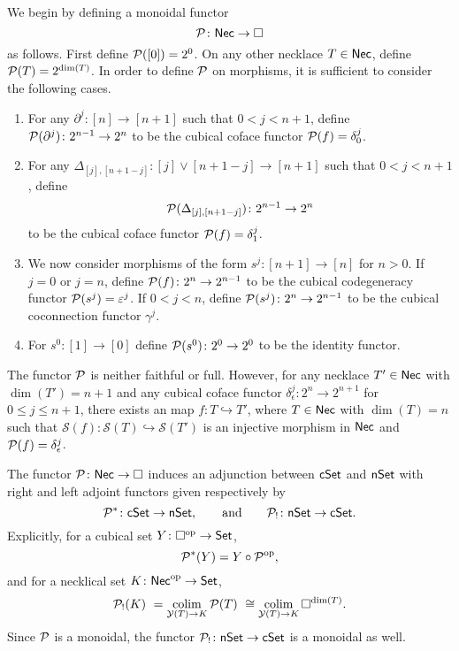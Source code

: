 We begin by defining a monoidal functor
\[
\mathcal{P} \colon \mathsf{Nec} \to \square
\]
as follows. First define $\mathcal{P}([0])=2^0$.
On any other necklace $T \in \mathsf{Nec}$, define $\mathcal{P}(T) = 2^{\dim(T)}$.
In order to define $\mathcal{P}$ on morphisms, it is sufficient to consider the following cases.
\begin{enumerate}
	\item For any $\partial^j \colon [n] \to [n+1]$ such that $0< j<{n+1}$, define $\mathcal{P}(\partial^j) \colon 2^{n-1}\to 2^{n}$ to be the cubical coface functor $\mathcal{P}(f)= \delta_0^{j}$.

	\item For any $\Delta_{[j], [n+1-j]} \colon [j] \vee [n+1-j] \to [n+1]$ such that $0<j<n+1$, define
	\[
	\mathcal{P}(\Delta_{[j], [n+1-j]}) \colon 2^{n-1}\to 2^{n}
	\]
	to be the cubical coface functor $\mathcal{P}(f)=\delta_1^{j}$.

	\item We now consider morphisms of the form $s^j \colon [n+1] \to [n]$ for $n>0$.
	If $j=0$ or $j=n$, define $\mathcal{P}(f) \colon 2^n \to 2^{n-1}$ to be the cubical codegeneracy functor $\mathcal{P}(s^j)= \varepsilon^{j}$.
	If $0<j<n$, define $\mathcal{P}(s^j) \colon 2^n \to 2^{n-1}$ to be the cubical coconnection functor $\gamma^{j}$.

	\item For $s^0 \colon [1] \to [0]$ define $\mathcal{P}(s^0) \colon 2^0 \to 2^0$ to be the identity functor.
\end{enumerate}

\begin{remark}
	The functor $\mathcal{P}$ is neither faithful or full.
	However, for any necklace $T' \in \mathsf{Nec}$ with $\dim(T')=n+1$ and any cubical coface functor $\delta_{\epsilon}^j \colon 2^n \to 2^{n+1}$ for $0 \leq j \leq n+1$, there exists an map $f \colon T \hookrightarrow T'$, where $T \in \mathsf{Nec}$ with $\dim(T)=n$ such that $\mathcal{S}(f) \colon \mathcal{S}(T) \hookrightarrow \mathcal{S}(T')$ is an injective morphism in $\mathsf{Nec}$ and $\mathcal{P}(f) = \delta_{\epsilon}^j$.
\end{remark}

The functor $\mathcal{P} \colon \mathsf{Nec} \to \square$ induces an adjunction between $\mathsf{cSet}$ and $\mathsf{nSet}$ with right and left adjoint functors given respectively by
\[
\mathcal{P}^\ast \colon \mathsf{cSet} \to \mathsf{nSet},
\qquad \text{and} \qquad
\mathcal{P}_{!} \colon \mathsf{nSet} \to \mathsf{cSet}.
\]
Explicitly, for a cubical set $Y \colon \square^{\mathrm{op}} \to \mathsf{Set}$,
\[
\mathcal{P}^\ast(Y)= Y \circ \mathcal{P}^{\mathrm{op}},
\]
and for a necklical set $K \colon \mathsf{Nec}^{\mathrm{op}} \to \mathsf{Set}$,
\[
\mathcal{P}_{!}(K) \ =
\operatorname*{colim}_{\mathcal{Y}(T) \to K} \mathcal{P}(T) \ \cong
\operatorname*{colim}_{\mathcal{Y}(T) \to K} \square^{\dim(T)}.
\]
Since $\mathcal{P}$ is a monoidal, the functor $\mathcal{P}_{!} \colon \mathsf{nSet} \to \mathsf{cSet}$ is a monoidal as well.

